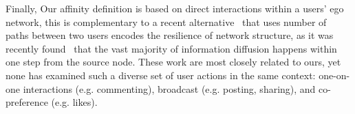 
Finally, Our affinity definition is based on direct interactions within a users' ego network, this is complementary to 
a recent alternative~\cite{Panigrahy2012ubr} that uses number of paths between two users encodes the resilience of network structure, 
as it was recently found~\cite{Goel2012structure} that the vast majority of information diffusion
happens within one step from the source node. 
These work are most closely related to ours, yet none has examined such a diverse set of user actions in the same context: one-on-one interactions (e.g. commenting), broadcast (e.g. posting, sharing), and co-preference (e.g. likes). 





